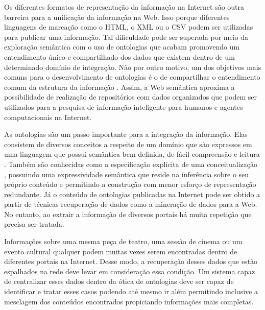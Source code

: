 Os diferentes formatos de representação da informação na Internet são outra barreira para a unificação da informação na Web. Isso porque diferentes linguagens de marcação como o HTML, o XML ou o CSV podem ser utilizadas para publicar uma informação. Tal dificuldade pode ser superada por meio da exploração semântica com o uso de ontologias \citep{Gali2004} que acabam promovendo um entendimento único e compartilhado dos dados que existem dentro de um determinado domínio de integração. Não por outro motivo, um dos objetivos mais comuns para o desenvolvimento de ontologias é o de compartilhar o entendimento comum da estrutura da informação \citep{Noy2001}. Assim, a Web semântica aproxima a possibilidade de realização de repositórios com dados organizados que podem ser utilizados para a pesquisa de informação inteligente para humanos e agentes computacionais \citep{Gali2004} na Internet.

As ontologias são um passo importante para a integração da informação. Elas consistem de diversos conceitos a respeito de um domínio que são expressos em uma linguagem que possui semântica bem definida, de fácil compreensão e leitura \citep{Gali2004}. Também são conhecidas como a especificação explícita de uma conceitualização \citep{Gruber1993}, possuindo uma expressividade semântica que reside na inferência sobre o seu próprio conteúdo e permitindo a construção com menor esforço de representação redundante. Já o conteúdo de ontologias publicadas na Internet pode ser obtido a partir de técnicas recuperação de dados como a mineração de dados para a Web. No entanto, ao extrair a informação de diversos portais há muita repetição que precisa ser tratada. 

Informações sobre uma mesma peça de teatro, uma sessão de cinema ou um evento cultural qualquer podem muitas vezes serem encontradas dentro de diferentes portais na Internet. Desse modo, a recuperação desses dados que estão espalhados na rede deve levar em consideração essa condição. Um sistema capaz de centralizar esses dados dentro da ótica de ontologias deve ser capaz de identificar e tratar esses casos podendo até mesmo ir além permitindo inclusive a mesclagem dos conteúdos encontrados propiciando informações mais completas.

